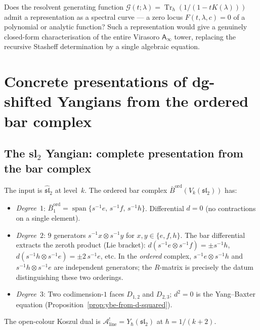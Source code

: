 \documentclass[11pt]{article}
\newcommand{\cA}{\mathcal{A}}
\newcommand{\Ainf}{\mathsf{A}_{\infty}}
\newcommand{\Tr}{\operatorname{Tr}}
\begin{document}
\begin{question}
\label{q:spectral-curve-wn}
Does the resolvent generating function
$\mathcal{G}(t;\lambda) = \Tr_h(1/(1-tK(\lambda)))$ admit a
representation as a spectral curve --- a zero locus
$F(t, \lambda, c) = 0$ of a polynomial or analytic function?
Such a representation would give a genuinely closed-form
characterisation of the entire Virasoro $\Ainf$ tower,
replacing the recursive Stasheff determination by a single
algebraic equation.
\end{question}


\section{Concrete presentations of dg-shifted Yangians from the ordered bar complex}

\subsection{The sl$_2$ Yangian: complete presentation from the bar complex}

The input is $\widehat{\mathfrak{sl}}_2$ at level~$k$.  The ordered bar complex
$\bar{B}^{\mathrm{ord}}(V_k(\mathfrak{sl}_2))$ has:
\begin{itemize}[nosep]
\item \emph{Degree~$1$}: $\bar{B}^{\mathrm{ord}}_1 = \operatorname{span}\{s^{-1}e,\,s^{-1}f,\,s^{-1}h\}$.
  Differential $d = 0$ (no contractions on a single element).
\item \emph{Degree~$2$}: $9$ generators $s^{-1}x \otimes s^{-1}y$ for
  $x,y \in \{e,f,h\}$.  The bar differential extracts the zeroth
  product (Lie bracket):
  $d(s^{-1}e \otimes s^{-1}f) = \pm s^{-1}h$,
  $d(s^{-1}h \otimes s^{-1}e) = \pm 2\,s^{-1}e$, etc.
  In the \emph{ordered} complex, $s^{-1}e \otimes s^{-1}h$ and
  $s^{-1}h \otimes s^{-1}e$ are independent generators;
  the $R$-matrix is precisely the datum distinguishing these two
  orderings.
\item \emph{Degree~$3$}: Two codimension-$1$ faces $D_{1,2}$ and $D_{2,3}$;
  $d^2 = 0$ is the Yang--Baxter equation
  (Proposition~\ref{prop:ybe-from-d-squared}).
\end{itemize}
The open-colour Koszul dual is
$\cA^!_{\mathrm{line}} = Y_\hbar(\mathfrak{sl}_2)$ at
$\hbar = 1/(k+2)$.
\end{document}
